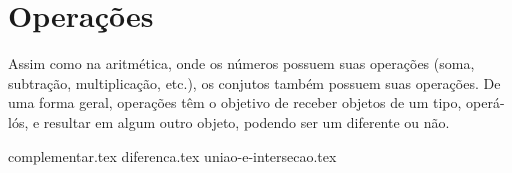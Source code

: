 \section{Operações}
Assim como na aritmética, onde os números possuem suas operações (soma, subtração,  multiplicação, etc.), os conjutos também possuem suas operações.
De uma forma geral, operações têm o objetivo de receber objetos de um tipo, operá-lós, e resultar em algum outro objeto, podendo ser um diferente ou não.

{complementar.tex}
{diferenca.tex}
{uniao-e-intersecao.tex}

